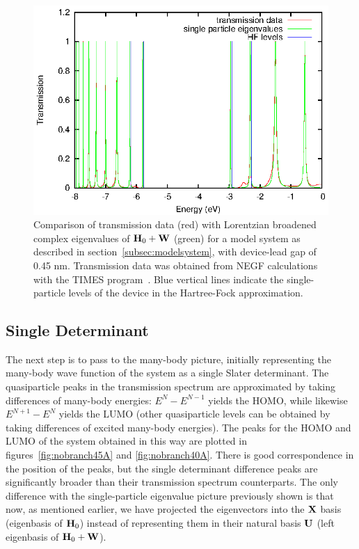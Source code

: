 \begin{figure} 
	\begin{center}
		\includegraphics[width=0.9\linewidth]{figures/13evals}
	\end{center}
	\caption{Comparison of transmission data (red) with Lorentzian
	broadened complex eigenvalues of $\mathbf{H}_0 + \mathbf{W}$ (green) for a
	model system as described in section~\ref{subsec:modelsystem}, with
	device-lead gap of 0.45 nm. Transmission data was obtained from
	\ac{NEGF} calculations with the TIMES program~\cite{times}.
        Blue vertical lines indicate the single-particle levels of the device
        in the Hartree-Fock approximation.}
	\label{fig:13evals}
\end{figure}

\subsection{Single Determinant}
\label{subsec:SingleDeterminant}

The next step is to pass to the many-body picture, initially representing the
many-body wave function of the system as a single Slater determinant. The
quasiparticle peaks in the transmission spectrum are approximated by taking
differences of many-body energies: $E^N - E^{N-1}$ yields the \ac{HOMO}, while
likewise $E^{N+1} - E^N$ yields the \ac{LUMO} (other quasiparticle levels can be
obtained by taking differences of excited many-body energies). The peaks for
the \ac{HOMO} and \ac{LUMO} of the system obtained in this way are plotted in
figures~\ref{fig:nobranch45A} and \ref{fig:nobranch40A}. There is good
correspondence in the position of the peaks, but the single determinant
difference peaks are significantly broader than their transmission spectrum
counterparts. The only difference with the single-particle eigenvalue picture
previously shown is that now, as mentioned earlier, we have projected the
eigenvectors into the $\mathbf{X}$ basis (eigenbasis of $\mathbf{H}_0$) instead of
representing them in their natural basis $\mathbf{U}$ (left eigenbasis of
$\mathbf{H}_0 + \mathbf{W}$).

